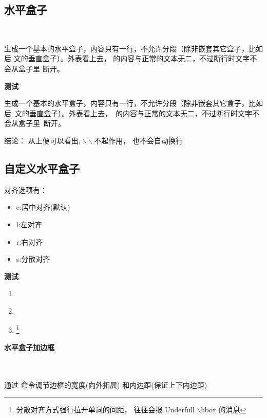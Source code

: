 \documentclass[fontset=windows, 12pt]{article}
\begin{document}
\subsection{水平盒子}
\begin{command}
    \marg*{\ldots} \\
    \marg*{\ldots}
\end{command}
 生成一个基本的水平盒子，内容只有一行，不允许分段（除非嵌套其它盒子，比如后
文的垂直盒子）。外表看上去， 的内容与正常的文本无二，不过断行时文字不会从盒子里
断开。

\textbf{测试}\par
\mbox{生成一个基本的水平盒子，内容只有一行，不允许分段（除非嵌套其它盒子，比如后
文的垂直盒子）。\\外表看上去， 的内容与正常的文本无二，不过断行时文字不会从盒子里
断开。
}

{
    \kaishu
    \textsf{结论：}
    从上便可以看出, $\backslash \backslash$不起作用， 也不会自动换行
}

\subsection{自定义水平盒子}
对齐选项有：
\begin{itemize}
    \item c:居中对齐(默认)
    \item l:左对齐
    \item r:右对齐
    \item s:分散对齐
\end{itemize}
\textbf{测试}\par

\begin{enumerate}
    \item {}
    \item {}\\
    \item {}\footnote[1]
    {分散对齐方式强行拉开单词的间距，
    往往会报 Underfull $\backslash$hbox 的消息}
\end{enumerate}    


\textbf{水平盒子加边框}

\begin{command}
    \marg*{\ldots} \\
    \marg*{\ldots}\\
    \marg*{\ldots}
    通过  命令调节边框的宽度(向外拓展)  和内边距(保证上下内边距)  
\end{command}
\end{document}
